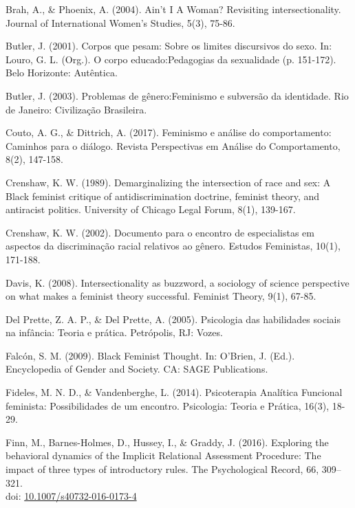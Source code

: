 \hangindent=25pt
\noindent Brah, A., \& Phoenix, A. (2004). Ain’t I A Woman? Revisiting intersectionality. Journal of International Women’s Studies, 5(3), 75-86.

\hangindent=25pt
\noindent Butler, J. (2001). Corpos que pesam: Sobre os limites discursivos do sexo. In: Louro, G. L. (Org.). O corpo educado:Pedagogias da sexualidade (p. 151-172). Belo Horizonte: Autêntica.

\hangindent=25pt
\noindent Butler, J. (2003). Problemas de gênero:Feminismo e subversão da identidade. Rio de Janeiro: Civilização Brasileira. 

\hangindent=25pt
\noindent Couto, A. G., \& Dittrich, A. (2017). Feminismo e análise do comportamento: Caminhos para o diálogo. Revista Perspectivas em Análise do Comportamento, 8(2), 147-158. 

\hangindent=25pt
\noindent Crenshaw, K. W. (1989). Demarginalizing the intersection of race and sex: A Black feminist critique of antidiscrimination doctrine, feminist theory, and antiracist politics. University of Chicago Legal Forum, 8(1), 139-167. 

\hangindent=25pt
\noindent Crenshaw, K. W. (2002). Documento para o encontro de especialistas em aspectos da discriminação racial relativos ao gênero. Estudos Feministas, 10(1), 171-188.

\hangindent=25pt
\noindent Davis, K. (2008). Intersectionality as buzzword, a sociology of science perspective on what makes a feminist theory successful. Feminist Theory, 9(1), 67-85. 

\hangindent=25pt
\noindent Del Prette, Z. A. P., \& Del Prette, A. (2005). Psicologia das habilidades sociais na infância: Teoria e prática. Petrópolis, RJ: Vozes.

\hangindent=25pt
\noindent Falcón, S. M. (2009). Black Feminist Thought. In: O’Brien, J. (Ed.). Encyclopedia of Gender and Society. CA: SAGE Publications. 

\hangindent=25pt
\noindent Fideles, M. N. D., \& Vandenberghe, L. (2014). Psicoterapia Analítica Funcional feminista: Possibilidades de um encontro. Psicologia: Teoria e Prática, 16(3), 18-29.

\hangindent=25pt
\noindent Finn, M., Barnes-Holmes, D., Hussey, I., \& Graddy, J. (2016). Exploring the behavioral dynamics of the Implicit Relational Assessment Procedure: The impact of three types of introductory rules. The Psychological Record, 66, 309–321.\\doi: \url{10.1007/s40732-016-0173-4}

